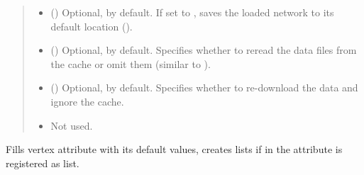 \documentclass[letterpaper,10pt,english]{sphinxmanual}
\begin{document}
\begin{fulllineitems}
\begin{fulllineitems}
\begin{quote}
\begin{description}
\begin{itemize}
\item {} 
 () \textendash{} Optional,  by default. If set to , saves
the loaded network to its default location
().

\item {} 
 () \textendash{} Optional,  by default. Specifies whether to reread
the data files from the cache or omit them (similar to
).

\item {} 
 () \textendash{} Optional,  by default. Specifies whether to
re-download the data and ignore the cache.

\item {} 
 \textendash{} 
Not used.


\end{itemize}

\end{description}\end{quote}

\end{fulllineitems}


\begin{fulllineitems}
\label{\detokenize{main:pypath.main.PyPath.init_vertex_attr}}
Fills vertex attribute with its default values, creates
lists if in  the attribute is registered as list.

\end{fulllineitems}


\begin{fulllineitems}
\label{\detokenize{main:pypath.main.PyPath.intergroup_shortest_paths}}
\end{fulllineitems}


\end{fulllineitems}
\end{document}
